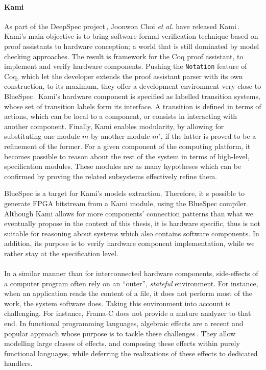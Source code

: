 \paragraph{Kami}
%
As part of the DeepSpec project\,\cite{appel2017deepspec}, Joonwon Choi \emph{et
  al.} have released Kami\,\cite{choi2017kami}.
%
Kami's main objective is to bring software formal verification technique based
on proof assistants to hardware conception; a world that is still dominated by
model checking approaches.
%
The result is framework for the Coq proof assistant, to implement and verify
hardware components.
%
Pushing the \texttt{Notation} feature of Coq, which let the developer extends
the proof assistant parser with its own construction, to its maximum, they offer
a development environment very close to BlueSpec\,\cite{nikhil2004bluespec}.
%
Kami's hardware component is specified as labelled transition systems, whose set
of transition labels form its interface.
%
A transition is defined in terms of actions, which can be local to a component,
or consists in interacting with another component.
%
Finally, Kami enables modularity, by allowing for substituting one module $m$ by
another module $m'$, if the latter is proved to be a refinement of the former.
%
For a given component of the computing platform, it becomes possible to reason
about the rest of the system in terms of high-level, specification modules.
%
These modules are as many hypotheses which can be confirmed by proving the
related subsystems effectively refine them.

BlueSpec is a target for Kami's models extraction.
%
Therefore, it s possible to generate FPGA bitstream from a Kami module, using
the BlueSpec compiler.
%
Although Kami allows for more components’ connection patterns than what we
eventually propose in the context of this thesis, it is hardware specific, thus
is not suitable for reasoning about systems which also contains software
components.
%
In addition, its purpose is to verify hardware component implementation, while
we rather stay at the specification level.

\paragraph{}
%
In a similar manner than for interconnected hardware components, side-effects of
a computer program often rely on an ``outer'', \emph{stateful} environment.
%
For instance, when an application reads the content of a file, it does not
perform most of the work, the system software does.
%
Taking this environment into account is challenging.
%
For instance, Frama-C does not provide a mature analyzer to that end.
%
In functional programming languages, algebraic effects are a recent and popular
approach whose purpose is to tackle these
challenges\,\cite{brady2014effects,bauer2015effects}.
%
They allow modelling large classes of effects, and composing these effects
within purely functional languages, while deferring the realizations of these
effects to dedicated handlers.


